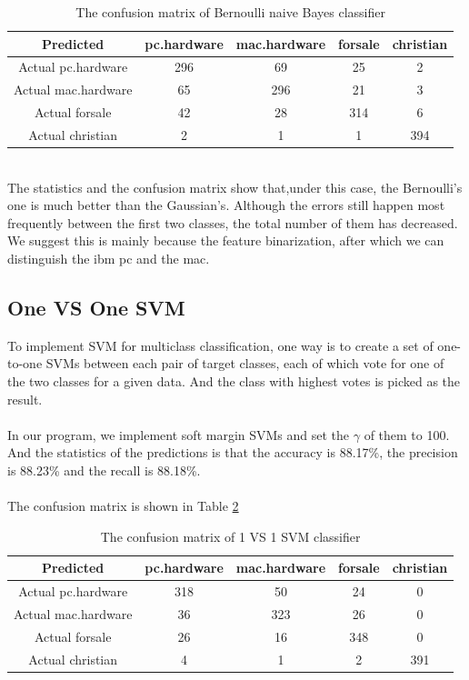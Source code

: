 \documentclass{article}
\begin{document}
\begin{table}
\begin{center}
\caption{The confusion matrix of Bernoulli naive Bayes classifier}
\label{tb:confu_mul_bnb}
\begin{tabular}{|c|c|c|c|c|}
\hline
Predicted&pc.hardware&mac.hardware&forsale&christian\\
\hline
Actual pc.hardware&296&69&25&2\\
\hline
Actual mac.hardware&65&296&21&3\\
\hline
Actual forsale&42&28&314&6\\
\hline
Actual christian&2&1&1&394\\
\hline
\end{tabular}
\end{center}
\end{table}
\\
The statistics and the confusion matrix show that,under this case, the Bernoulli's one is much better than the Gaussian's. Although the errors still happen most frequently between the first two classes, the total number of them has decreased. We suggest this is mainly because the feature binarization, after which we can distinguish the ibm pc and the mac.

\subsection{One VS One SVM}
To implement SVM for multiclass classification, one way is to create a set of one-to-one SVMs between each pair of target classes, each of which vote for one of the two classes for a given data. And the class with highest votes is picked as the result.\\
\\
In our program, we implement soft margin SVMs and set the $\gamma$ of them to 100. And the statistics of the predictions is that the accuracy is 88.17\%, the precision is 88.23\% and the recall is 88.18\%.\\
\\
The confusion matrix is shown in Table \ref{tb:confu_mul_svm_ovo}
\begin{table}
\begin{center}
\caption{The confusion matrix of 1 VS 1 SVM classifier}
\label{tb:confu_mul_svm_ovo}
\begin{tabular}{|c|c|c|c|c|}
\hline
Predicted&pc.hardware&mac.hardware&forsale&christian\\
\hline
Actual pc.hardware&318&50&24&0\\
\hline
Actual mac.hardware&36&323&26&0\\
\hline
Actual forsale&26&16&348&0\\
\hline
Actual christian&4&1&2&391\\
\hline
\end{tabular}
\end{center}
\end{table}
\end{document}
